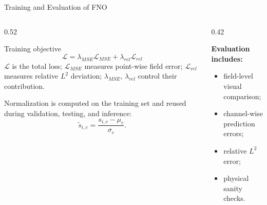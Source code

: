 \documentclass[aspectratio=169,10pt]{beamer}
\begin{document}
\begin{frame}{Training and Evaluation of FNO}
\centering


\vspace{0.15cm}

\begin{columns}[T]
    \begin{column}{0.52\textwidth}

        \begin{block}{Training objective}
        \[
        \mathcal{L}=\lambda_{MSE}\mathcal{L}_{MSE}
        +\lambda_{rel}\mathcal{L}_{rel}
        \]
        \scriptsize
        \(\mathcal{L}\) is the total loss;
        \(\mathcal{L}_{MSE}\) measures point-wise field error;
        \(\mathcal{L}_{rel}\) measures relative \(L^2\) deviation;
        \(\lambda_{MSE}\), \(\lambda_{rel}\) control their contribution.
        \end{block}

        \scriptsize
        Normalization is computed on the training set and reused during
        validation, testing, and inference:
        \[
          \tilde{s}_{i,c}=\frac{s_{i,c}-\mu_c}{\sigma_c}.
        \]

    \end{column}

    \begin{column}{0.42\textwidth}

        \footnotesize
        \textbf{Evaluation includes:}
        \scriptsize
        \begin{itemize}
            \item field-level visual comparison;
            \item channel-wise prediction errors;
            \item relative \(L^2\) error;
            \item physical sanity checks.
        \end{itemize}


\end{column}
\end{columns}
\end{frame}
\end{document}
